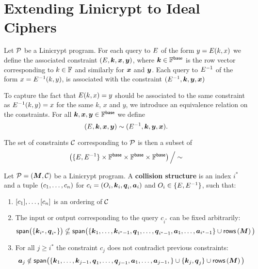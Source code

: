 \chapter{Extending Linicrypt to Ideal Ciphers}

Let $\P$ be a Linicrypt program.
For each query to $\E$ of the form $y = \E(k,x)$ we define the associated constraint
$(\E, \v k, \v x, \v y)$, where $\v k \in \F^\base$ is the row vector corresponding
to $k \in \F$ and similarly for $\v x$ and $\v y$.
Each query to $\D$ of the form $x = \D(k, y)$, is associated with the
constraint $(\D, \v k, \v y, \v x)$

To capture the fact that $\E(k, x) = y$ should be associated to the same
constraint as $\D(k,y) = x$ for the same $k$, $x$ and $y$,
we introduce an equivalence relation on the constraints. 
For all $\v k, \v x, \v y \in \Base$ we define
\[
    (\E, \v k,\v x, \v y) \sim (\D, \v k, \v y, \v x).
\]

The set of constraints $\C$ corresponding to $\P$ is then a subset of
\[
    \left( \{\E, \D\} \times \Base \times \Base \times \Base \right) \Big/\sim
\]


\begin{defn}
    Let $\P = (\M, \C)$ be a Linicrypt program.
    A \textbf{collision structure} is an index $i^*$ and a tuple
    $(\c_1, \dots, \c_n)$ for $c_i = (O_i, \v k_i, \v q_i, \v a_i)$ and
    $O_i \in \{\E, \D\}$, such that:
    \begin{enumerate}
        \item $[\c_1], \dots, [\c_n]$ is an ordering of $\C$
        \item The input or output corresponding to the query $c_{i^*}$ can be fixed arbitrarily:
        \[
            \span\big(\{ \v k_{i^*}, \v q_{i^*} \}\big) \nsubseteq
            \span\big( 
            \{
            \v k_1, \dots, \v k_{i^* -1},
            \v q_1, \dots, \v q_{i^* -1},
            \v a_1, \dots, \v a_{i^* -1}
            \}
            \cup \rows\left(\M\right)
            \big)
        \]
        \item For all $j \geq i^*$ the constraint $c_j$ does not contradict previous constraints: 
        \[
            \v a_j \notin \span\big( \{
            \v k_1, \dots, \v k_{j -1},
            \v q_1, \dots, \v q_{j -1},
            \v a_1, \dots, \v a_{j -1},
            \} 
            \cup \{ \v k_j, \v q_j\}
            \cup \rows\left(\M\right)
            \big)
        \]
    \end{enumerate}
\end{defn}
